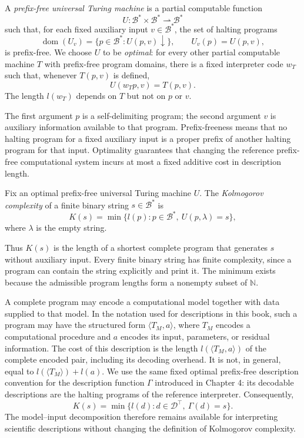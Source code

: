 \begin{definition}
\label{def:prefix-free-universal-machine}
A \emph{prefix-free universal Turing machine} is a partial computable function
\[
U:\mathcal{B}^*\times\mathcal{B}^*\rightharpoonup\mathcal{B}^*
\]
such that, for each fixed auxiliary input $v\in\mathcal{B}^*$, the set of halting programs
\[
\operatorname{dom}(U_v)=\{p\in\mathcal{B}^*:U(p,v)\downarrow\},
\qquad U_v(p)=U(p,v),
\]
is prefix-free. We choose $U$ to be \emph{optimal}: for every other partial computable machine $T$ with prefix-free program domains, there is a fixed interpreter code $w_T$ such that, whenever $T(p,v)$ is defined,
\[
U(w_Tp,v)=T(p,v).
\]
The length $l(w_T)$ depends on $T$ but not on $p$ or $v$.
\end{definition}

The first argument $p$ is a self-delimiting program; the second argument $v$ is auxiliary information available to that program. Prefix-freeness means that no halting program for a fixed auxiliary input is a proper prefix of another halting program for that input. Optimality guarantees that changing the reference prefix-free computational system incurs at most a fixed additive cost in description length.

\begin{definition}
\label{def:Kolmogorov-Complexity}
Fix an optimal prefix-free universal Turing machine $U$. The \emph{Kolmogorov complexity} of a finite binary string $s\in\mathcal{B}^*$ is
\[
K(s)=\min\{l(p):p\in\mathcal{B}^*,\ U(p,\lambda)=s\},
\]
where $\lambda$ is the empty string.
\end{definition}

Thus $K(s)$ is the length of a shortest complete program that generates $s$ without auxiliary input. Every finite binary string has finite complexity, since a program can contain the string explicitly and print it. The minimum exists because the admissible program lengths form a nonempty subset of $\mathbb{N}$.

A complete program may encode a computational model together with data supplied to that model. In the notation used for descriptions in this book, such a program may have the structured form $\langle T_M,a\rangle$, where $T_M$ encodes a computational procedure and $a$ encodes its input, parameters, or residual information. The cost of this description is the length $l(\langle T_M,a\rangle)$ of the complete encoded pair, including its decoding overhead. It is not, in general, equal to $l(\langle T_M\rangle)+l(a)$. We use the same fixed optimal prefix-free description convention for the description function $\Gamma$ introduced in Chapter 4: its decodable descriptions are the halting programs of the reference interpreter. Consequently,
\[
K(s)=\min\{l(d):d\in\mathcal{D}^{\top},\ \Gamma(d)=s\}.
\]
The model--input decomposition therefore remains available for interpreting scientific descriptions without changing the definition of Kolmogorov complexity.


